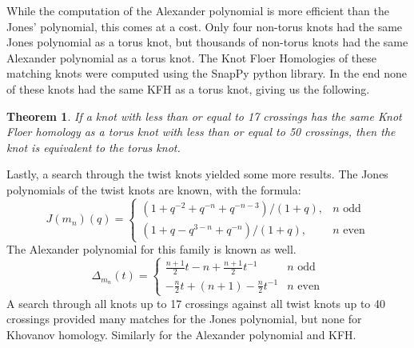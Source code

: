 \documentclass{article}
\theoremstyle{plain}
\newtheorem{theorem}{Theorem}
\begin{document}
        While the computation of the Alexander polynomial is more efficient
        than the Jones' polynomial, this comes at a cost. Only four non-torus
        knots had the same Jones polynomial as a torus knot, but thousands of
        non-torus knots had the same Alexander polynomial as a torus knot.
        The Knot Floer Homologies of these matching knots were computed using
        the SnapPy python library. In the end none of these knots had the same
        KFH as a torus knot, giving us the following.
        \begin{theorem}
            If a knot with less than or equal to 17 crossings has the same
            Knot Floer homology as a torus knot with less than or equal to 50
            crossings, then the knot is equivalent to the torus knot.
        \end{theorem}
        Lastly, a search through the twist knots yielded some more results.
        The Jones polynomials of the twist knots are known, with the formula:
        \begin{equation}
            J(m_{n})(q)=
            \begin{cases}
                (1+q^{-2}+q^{-n}+q^{-n-3})/(1+q),&n\textrm{ odd}\\
                (1+q-q^{3-n}+q^{-n})/(1+q),&n\textrm{ even}
            \end{cases}
        \end{equation}
        The Alexander polynomial for this family is known as well.
        \begin{equation}
            \Delta_{m_{n}}(t)=
            \begin{cases}
                \frac{n+1}{2}t-n+\frac{n+1}{2}t^{-1}&n\textrm{ odd}\\
                -\frac{n}{2}t+(n+1)-\frac{n}{2}t^{-1}&n\textrm{ even}
            \end{cases}
        \end{equation}
        A search through all knots up to 17 crossings against all twist knots
        up to 40 crossings provided many matches for the Jones polynomial, but
        none for Khovanov homology. Similarly for the Alexander polynomial and
        KFH.
\end{document}
